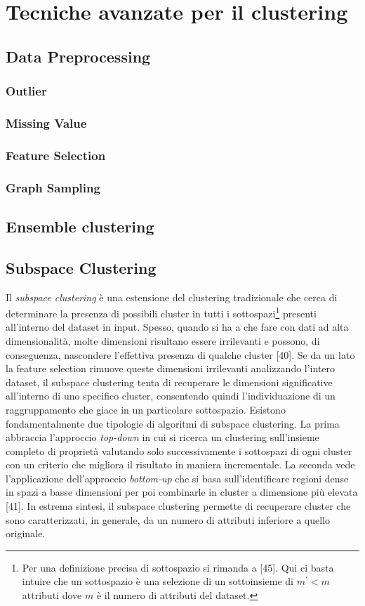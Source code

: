 \section{Tecniche avanzate per il clustering}
\subsection{Data Preprocessing}
\subsubsection{Outlier}
\subsubsection{Missing Value}
\subsubsection{Feature Selection}
\subsubsection{Graph Sampling}

\subsection{Ensemble clustering}
\subsection{Subspace Clustering}
Il \textit{subspace clustering} \`e una estensione del clustering tradizionale che cerca di determinare la presenza di possibili cluster in tutti i sottospazi\footnote{Per una definizione precisa di sottospazio si rimanda a [45]. Qui ci basta intuire che un sottospazio \`e una selezione di un sottoinsieme di $ m^{'} < m $ attributi dove $ m $ \`e il numero di attributi del dataset.} presenti all'interno del dataset in input. 
Spesso, quando si ha a che fare con dati ad alta dimensionalit\`a, molte dimensioni risultano essere irrilevanti e possono, di conseguenza, nascondere l'effettiva presenza di qualche cluster [40]. Se da un lato la feature selection rimuove queste dimensioni irrilevanti analizzando l'intero dataset, il subspace clustering tenta di recuperare le dimensioni significative all'interno di uno specifico cluster, consentendo quindi l'individuazione di un raggruppamento che giace in un particolare sottospazio. Esistono fondamentalmente due tipologie di algoritmi di subspace clustering. La prima abbraccia l'approccio \textit{top-down} in cui si ricerca un clustering sull'insieme completo di propriet\`a valutando solo successivamente i sottospazi di ogni cluster con un criterio che migliora il risultato in maniera incrementale. La seconda vede l'applicazione dell'approccio \textit{bottom-up} che si basa sull'identificare regioni dense in spazi a basse dimensioni per poi combinarle in cluster a dimensione pi\`u elevata [41]. In estrema sintesi, il subspace clustering permette di recuperare cluster che sono caratterizzati, in generale, da un numero di attributi inferiore a quello originale. 

